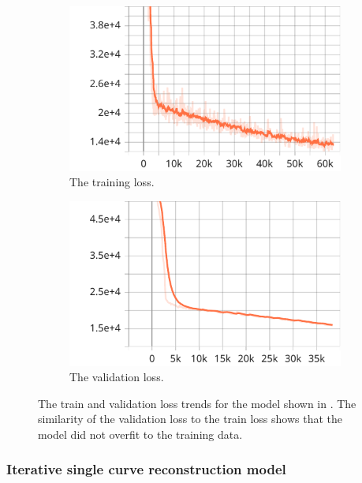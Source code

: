 \begin{figure}
    \centering
    \begin{subfigure}{.45\textwidth}
        \includegraphics[width=\textwidth]{graphics/work-artifacts/im2vec/587/loss.pdf}
        \caption{The training loss.}
    \end{subfigure}
    \begin{subfigure}{.45\textwidth}
        \includegraphics[width=\textwidth]{graphics/work-artifacts/im2vec/587/avg_val_loss.pdf}
        \caption{The validation loss.}
    \end{subfigure}
    \caption{The train and validation loss trends for the model shown in . The similarity of the validation loss to the train loss shows that the model did not overfit to the training data.}
    \label{fig:587.loss}
\end{figure}

\subsubsection{Iterative single curve reconstruction model}
\label{subsec:early.iterative.single}


